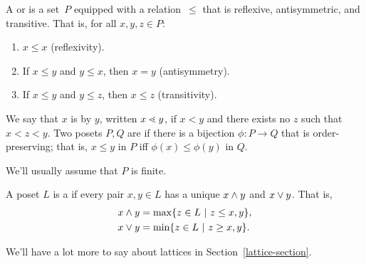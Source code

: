 \begin{definition}
A  or  is a set~$P$ equipped with a relation~$\leq$ that is reflexive, antisymmetric, and transitive.  That is, for all $x,y,z\in P$:
\begin{enumerate}
\item $x\leq x$ (reflexivity).
\item If $x\leq y$ and $y\leq x$, then $x=y$ (antisymmetry).
\item If $x\leq y$ and $y\leq z$, then $x\leq z$ (transitivity).
\end{enumerate}
We say that $x$ is  by $y$, written $x\lessdot y$, if $x<y$
and there exists no $z$ such that $x<z<y$.  Two posets $P,Q$ are  if there is a bijection $\phi:P\to Q$ that is order-preserving; that is, $x\leq y$ in $P$ iff $\phi(x)\leq\phi(y)$ in $Q$.
\end{definition}

We'll usually assume that $P$ is finite.


\begin{definition} A poset $L$ is a  if every pair $x,y\in L$
has a unique  $x\wedge y$ and  $x\vee y$.  That is,
  \begin{align*}
  x\wedge y &= \max\{z\in L ~|~ z\leq x,y\},\\
  x\vee y &= \min\{z\in L ~|~ z\geq x,y\}.
  \end{align*}
\end{definition}
We'll have a lot more to say about lattices in Section~\ref{lattice-section}.


